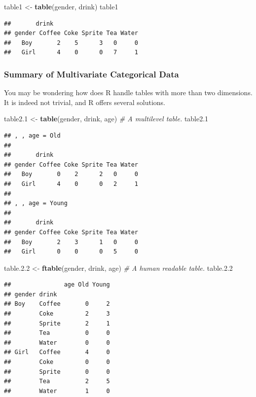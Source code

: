 \documentclass[]{book}
\newenvironment{Shaded}{\begin{snugshade}}{\end{snugshade}}
\newcommand{\KeywordTok}[1]{\textcolor[rgb]{0.13,0.29,0.53}{\textbf{{#1}}}}
\newcommand{\FloatTok}[1]{\textcolor[rgb]{0.00,0.00,0.81}{{#1}}}
\newcommand{\StringTok}[1]{\textcolor[rgb]{0.31,0.60,0.02}{{#1}}}
\newcommand{\CommentTok}[1]{\textcolor[rgb]{0.56,0.35,0.01}{\textit{{#1}}}}
\newcommand{\NormalTok}[1]{{#1}}
\theoremstyle{definition}
\theoremstyle{definition}
\theoremstyle{remark}
\begin{document}
\begin{Shaded}
\begin{Highlighting}[]
\NormalTok{table1 <-}\StringTok{ }\KeywordTok{table}\NormalTok{(gender, drink) }
\NormalTok{table1                                      }
\end{Highlighting}
\end{Shaded}

\begin{verbatim}
##       drink
## gender Coffee Coke Sprite Tea Water
##   Boy       2    5      3   0     0
##   Girl      4    0      0   7     1
\end{verbatim}

\subsubsection{Summary of Multivariate Categorical
Data}\label{summary-of-multivariate-categorical-data}

You may be wondering how does R handle tables with more than two
dimensions. It is indeed not trivial, and R offers several solutions.

\begin{Shaded}
\begin{Highlighting}[]
\NormalTok{table2}\FloatTok{.1} \NormalTok{<-}\StringTok{ }\KeywordTok{table}\NormalTok{(gender, drink, age) }\CommentTok{# A multilevel table. }
\NormalTok{table2}\FloatTok{.1}
\end{Highlighting}
\end{Shaded}

\begin{verbatim}
## , , age = Old
## 
##       drink
## gender Coffee Coke Sprite Tea Water
##   Boy       0    2      2   0     0
##   Girl      4    0      0   2     1
## 
## , , age = Young
## 
##       drink
## gender Coffee Coke Sprite Tea Water
##   Boy       2    3      1   0     0
##   Girl      0    0      0   5     0
\end{verbatim}

\begin{Shaded}
\begin{Highlighting}[]
\NormalTok{table}\FloatTok{.2.2} \NormalTok{<-}\StringTok{ }\KeywordTok{ftable}\NormalTok{(gender, drink, age) }\CommentTok{# A human readable table.}
\NormalTok{table}\FloatTok{.2.2}
\end{Highlighting}
\end{Shaded}

\begin{verbatim}
##               age Old Young
## gender drink               
## Boy    Coffee       0     2
##        Coke         2     3
##        Sprite       2     1
##        Tea          0     0
##        Water        0     0
## Girl   Coffee       4     0
##        Coke         0     0
##        Sprite       0     0
##        Tea          2     5
##        Water        1     0
\end{verbatim}
\end{document}
